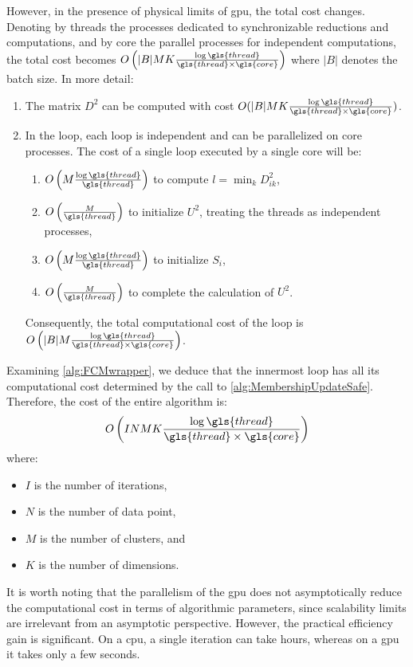 \begin{toReview}
	\noindent However, in the presence of physical limits of \gls{gpu}, the total cost changes. Denoting by \gls{thread}s the processes dedicated to synchronizable reductions and computations, and by \gls{core} the parallel processes for independent computations, the total cost becomes $O\left(|B|MK\frac{\log\gls{thread}}{\gls{thread}\times\gls{core}}\right)$ where $|B|$ denotes the batch size. In more detail:
	\begin{enumerate}
		\item The matrix $D^2$ can be computed with cost $O(|B|MK\frac{\log\gls{thread}}{\gls{thread}\times\gls{core}})$.
		\item In the loop, each loop is independent and can be parallelized on \gls{core} processes. The cost of a single loop executed by a single \gls{core} will be: \begin{enumerate}
			\item $O\left(M\frac{\log{\gls{thread}}}{\gls{thread}}\right)$ to compute $l = \min_k{D_{ik}^2}$,
			\item $O\left(\frac{M}{\gls{thread}}\right)$ to initialize $U^2$, treating the \gls{thread}s as independent processes,
			\item $O\left(M\frac{\log\gls{thread}}{\gls{thread}}\right)$ to initialize $S_i$,
			\item $O\left(\frac{M}{\gls{thread}}\right)$ to complete the calculation of $U^2$.
		\end{enumerate}
		\noindent Consequently, the total computational cost of the loop is $O\left(|B|M\frac{\log\gls{thread}}{\gls{thread}\times\gls{core}}\right)$.
	\end{enumerate}

	\bigskip \noindent Examining \cref{alg:FCMwrapper}, we deduce that the innermost loop has all its computational cost determined by the call to \cref{alg:MembershipUpdateSafe}. Therefore, the cost of the entire algorithm is:
	\[
		O\left(INMK\frac{\log\gls{thread}}{\gls{thread}\times\gls{core}}\right)
	\]
	where:
	\begin{itemize}
		\item $I$ is the number of iterations,
		\item $N$ is the number of data point,
		\item $M$ is the number of clusters, and
		\item $K$ is the number of dimensions.
	\end{itemize}

	\noindent It is worth noting that the parallelism of the \gls{gpu} does not asymptotically reduce the computational cost in terms of algorithmic parameters, since scalability limits are irrelevant from an asymptotic perspective. However, the practical efficiency gain is significant. On a \gls{cpu}, a single iteration can take hours, whereas on a \gls{gpu} it takes only a few seconds.


\end{toReview}
